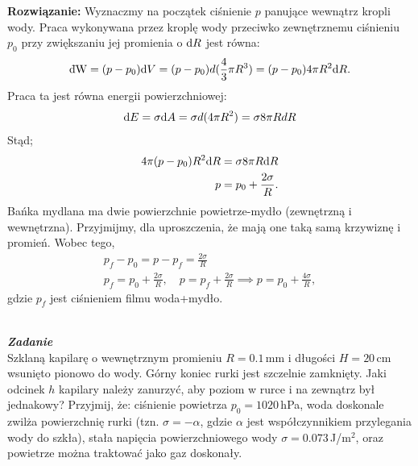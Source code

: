 \documentclass[11pt,a4paper]{article}
\newcommand{\dbar} {\ensuremath{\,\mathchar'26\mkern-12mu d}}
\newcounter{zadanie}\newcommand{\zadanie}[1][]{\addtocounter{zadanie}{1} ~\\  {\bf \emph{Zadanie \arabic{zadanie} #1 }} \\}
\begin{document}
\vspace{0.2cm}
\textbf{Rozwiązanie:} 
Wyznaczmy na początek ciśnienie $p$ panujące wewnątrz kropli wody. Praca wykonywana przez kroplę wody przeciwko zewnętrznemu ciśnieniu $p_0$ przy zwiększaniu jej promienia o ${\rm d} R $ jest równa:
\begin{align}
{\rm \dbar W} =  (p-p_0) {\rm d}V = (p-p_0)d(\frac{4}{3}\pi R^{3}) =  (p-p_0) 4\pi R^2 {\rm d}R.
\end{align}
Praca ta jest równa energii powierzchniowej:
\begin{align}
{\rm d} E = \sigma {\rm d} A = \sigma d(4\pi R^{2}) = \sigma 8\pi R dR
\end{align}
Stąd;
\begin{align}
4\pi (p-p_0)R^2 {\rm d}R = \sigma 8 \pi R {\rm d}R \\
 p= p_0 + \frac{2 \sigma}{R}.
\end{align}
Bańka mydlana ma dwie powierzchnie powietrze-mydło (zewnętrzną i wewnętrzna). Przyjmijmy, dla uproszczenia, że mają one taką samą krzywiznę i promień. Wobec tego,
\begin{align}
p_f - p_0 = p- p_f = \frac{2 \sigma}{R} \\
p_f = p_0 +  \frac{2 \sigma}{R}, \quad p = p_f +  \frac{2 \sigma}{R}  \implies p = p_0 +  \frac{4 \sigma}{R},
\end{align}
gdzie $p_f$ jest ciśnieniem filmu woda+mydło.\\
\newpage

\zadanie
Szklaną kapilarę o wewnętrznym promieniu $R = 0.1$\,mm i długości $H = 20$\,cm wsunięto pionowo
do wody. Górny koniec rurki jest szczelnie zamknięty. Jaki odcinek $h$ kapilary należy zanurzyć,
aby poziom w rurce i na zewnątrz był jednakowy?
Przyjmij, że: ciśnienie powietrza $p_0 = 1020$\,hPa,
woda doskonale zwilża powierzchnię rurki (tzn. $\sigma=-\alpha$,
gdzie $\alpha$ jest współczynnikiem przylegania wody do szkła),
stała napięcia powierzchniowego wody $\sigma = 0.073$\,J/m$^2$,
oraz powietrze można traktować jako gaz doskonały.
\end{document}

